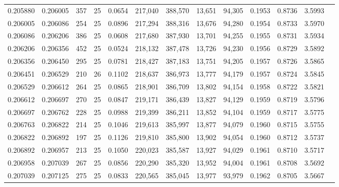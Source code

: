 \begin{tabular}{rrrrrrrrrrrrr}
0.205880 & 0.206005 &   357 &  25 &                                     0.0654 & 217,040 & 388,570 &  13,651 &  94,305 & 0.1953 & 0.8736 & 3.5993 \\
0.206005 & 0.206086 &   254 &  25 &                                     0.0896 & 217,294 & 388,316 &  13,676 &  94,280 & 0.1954 & 0.8733 & 3.5970 \\
0.206086 & 0.206206 &   386 &  25 &                                     0.0608 & 217,680 & 387,930 &  13,701 &  94,255 & 0.1955 & 0.8731 & 3.5934 \\
0.206206 & 0.206356 &   452 &  25 &                                     0.0524 & 218,132 & 387,478 &  13,726 &  94,230 & 0.1956 & 0.8729 & 3.5892 \\
0.206356 & 0.206450 &   295 &  25 &                                     0.0781 & 218,427 & 387,183 &  13,751 &  94,205 & 0.1957 & 0.8726 & 3.5865 \\
0.206451 & 0.206529 &   210 &  26 &                                     0.1102 & 218,637 & 386,973 &  13,777 &  94,179 & 0.1957 & 0.8724 & 3.5845 \\
0.206529 & 0.206612 &   264 &  25 &                                     0.0865 & 218,901 & 386,709 &  13,802 &  94,154 & 0.1958 & 0.8722 & 3.5821 \\
0.206612 & 0.206697 &   270 &  25 &                                     0.0847 & 219,171 & 386,439 &  13,827 &  94,129 & 0.1959 & 0.8719 & 3.5796 \\
0.206697 & 0.206762 &   228 &  25 &                                     0.0988 & 219,399 & 386,211 &  13,852 &  94,104 & 0.1959 & 0.8717 & 3.5775 \\
0.206763 & 0.206822 &   214 &  25 &                                     0.1046 & 219,613 & 385,997 &  13,877 &  94,079 & 0.1960 & 0.8715 & 3.5755 \\
0.206822 & 0.206892 &   197 &  25 &                                     0.1126 & 219,810 & 385,800 &  13,902 &  94,054 & 0.1960 & 0.8712 & 3.5737 \\
0.206892 & 0.206957 &   213 &  25 &                                     0.1050 & 220,023 & 385,587 &  13,927 &  94,029 & 0.1961 & 0.8710 & 3.5717 \\
0.206958 & 0.207039 &   267 &  25 &                                     0.0856 & 220,290 & 385,320 &  13,952 &  94,004 & 0.1961 & 0.8708 & 3.5692 \\
0.207039 & 0.207125 &   275 &  25 &                                     0.0833 & 220,565 & 385,045 &  13,977 &  93,979 & 0.1962 & 0.8705 & 3.5667 \\

\end{tabular}
